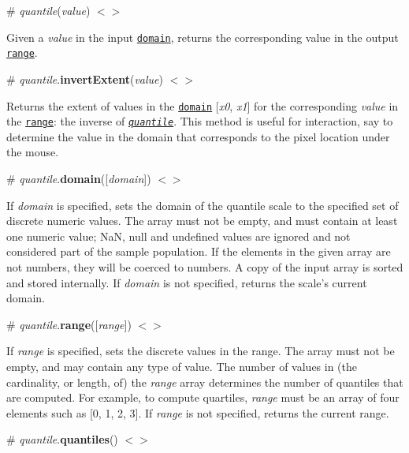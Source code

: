 \label{__quantile}%
\# {\itshape quantile}({\itshape value}) \href{https://github.com/d3/d3-scale/blob/master/src/quantile.js#L4}{\tt $<$$>$}

Given a {\itshape value} in the input \href{#quantile_domain}{\tt domain}, returns the corresponding value in the output \href{#quantile_range}{\tt range}.

\label{_quantile_invertExtent}%
\# {\itshape quantile}.{\bfseries invert\+Extent}({\itshape value}) \href{https://github.com/d3/d3-scale/blob/master/src/quantile.js#L20}{\tt $<$$>$}

Returns the extent of values in the \href{#quantile_domain}{\tt domain} \mbox{[}{\itshape x0}, {\itshape x1}\mbox{]} for the corresponding {\itshape value} in the \href{#quantile_range}{\tt range}\+: the inverse of \href{#_quantile}{\tt {\itshape quantile}}. This method is useful for interaction, say to determine the value in the domain that corresponds to the pixel location under the mouse.

\label{_quantile_domain}%
\# {\itshape quantile}.{\bfseries domain}(\mbox{[}{\itshape domain}\mbox{]}) \href{https://github.com/d3/d3-scale/blob/master/src/quantile.js#L28}{\tt $<$$>$}

If {\itshape domain} is specified, sets the domain of the quantile scale to the specified set of discrete numeric values. The array must not be empty, and must contain at least one numeric value; NaN, null and undefined values are ignored and not considered part of the sample population. If the elements in the given array are not numbers, they will be coerced to numbers. A copy of the input array is sorted and stored internally. If {\itshape domain} is not specified, returns the scale’s current domain.

\label{_quantile_range}%
\# {\itshape quantile}.{\bfseries range}(\mbox{[}{\itshape range}\mbox{]}) \href{https://github.com/d3/d3-scale/blob/master/src/quantile.js#L36}{\tt $<$$>$}

If {\itshape range} is specified, sets the discrete values in the range. The array must not be empty, and may contain any type of value. The number of values in (the cardinality, or length, of) the {\itshape range} array determines the number of quantiles that are computed. For example, to compute quartiles, {\itshape range} must be an array of four elements such as \mbox{[}0, 1, 2, 3\mbox{]}. If {\itshape range} is not specified, returns the current range.

\label{_quantile_quantiles}%
\# {\itshape quantile}.{\bfseries quantiles}() \href{https://github.com/d3/d3-scale/blob/master/src/quantile.js#L40}{\tt $<$$>$}

